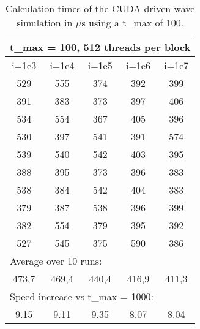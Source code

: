 \documentclass[a4paper]{article}
\begin{document}
		
		\begin{table}[H]
			\label{table:i_change_100}
			\caption{Calculation times of the CUDA driven wave simulation in $\mu$s using a t\_max of 100.}
			\begin{center}
				\begin{tabular}{| c | c | c | c | c |}
					\hline
					\multicolumn{5}{|l|}{t\_max = 100, 512 threads per block}\\
					\hline
					i=1e3 & i=1e4 & i=1e5 & i=1e6 & i=1e7\\ 
					\hline
					529 & 555 & 374 & 392 & 399\\ 
					\hline
					391 & 383 & 373 & 397 & 406\\ 
					\hline
					534 & 554 & 367 & 405 & 396\\ 
					\hline
					530 & 397 & 541 & 391 & 574\\ 
					\hline
					539 & 540 & 542 & 403 & 395\\ 
					\hline
					388 & 395 & 373 & 396 & 383\\ 
					\hline
					538 & 384 & 542 & 404 & 383\\ 
					\hline
					379 & 387 & 538 & 396 & 399\\ 
					\hline
					382 & 554 & 379 & 395 & 392\\ 
					\hline
					527 & 545 & 375 & 590 & 386\\ 
					\hline
					\multicolumn{5}{|l|}{Average over 10 runs:}\\
					\hline
					473,7 & 469,4 & 440,4 & 416,9 & 411,3\\ 
					\hline
					\multicolumn{5}{|l|}{Speed increase vs t\_max = 1000:}\\
					\hline
					9.15 & 9.11 & 9.35 & 8.07 & 8.04\\
					\hline
				\end{tabular}
			\end{center}
		\end{table}
		
\end{document}
